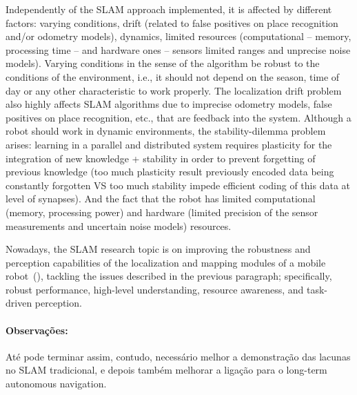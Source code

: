 \documentclass[10pt,a4paper,notitlepage,twocolumn,oneside]{article}
\begin{document}
Independently of the SLAM approach implemented, it is affected by different factors: varying conditions, drift (related to false positives on place recognition and/or odometry models), dynamics, limited resources (computational -- memory, processing time -- and hardware ones -- sensors limited ranges and unprecise noise models). Varying conditions in the sense of the algorithm be robust to the conditions of the environment, i.e., it should not depend on the season, time of day or any other characteristic to work properly. The localization drift problem also highly affects SLAM algorithms due to imprecise odometry models, false positives on place recognition, etc., that are feedback into the system. Although a robot should work in dynamic environments, the stability-dilemma problem arises: learning in a parallel and distributed system requires plasticity for the integration of new knowledge + stability in order to prevent forgetting of previous knowledge (too much plasticity result previously encoded data being constantly forgotten VS too much stability impede efficient coding of this data at level of synapses). And the fact that the robot has limited computational (memory, processing power) and hardware (limited precision of the sensor measurements and uncertain noise models) resources.

Nowadays, the SLAM research topic is on improving the robustness and perception capabilities of the localization and mapping modules of a mobile robot~(\cite{review:cadena:2016}), tackling the issues described in the previous paragraph; specifically, robust performance, high-level understanding, resource awareness, and task-driven perception.

\paragraph{Observações:} Até pode terminar assim, contudo, necessário melhor a demonstração das lacunas no SLAM tradicional, e depois também melhorar a ligação para o long-term autonomous navigation.


\end{document}
